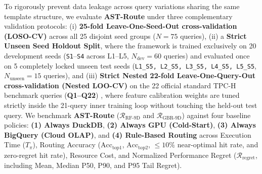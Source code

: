 \documentclass[10pt,a4paper]{article}
\begin{document}
To rigorously prevent data leakage across query variations sharing the same template structure, we evaluate \textbf{AST-Route} under three complementary validation protocols: (i) \textbf{25-fold Leave-One-Seed-Out cross-validation (LOSO-CV)} across all 25 disjoint seed groups ($N=75$ queries), (ii) a \textbf{Strict Unseen Seed Holdout Split}, where the framework is trained exclusively on 20 development seeds (\texttt{S1}--\texttt{S4} across L1--L5, $N_{\text{dev}}=60$ queries) and evaluated once on 5 completely locked unseen test seeds (\texttt{L1\_S5, L2\_S5, L3\_S5, L4\_S5, L5\_S5}, $N_{\text{unseen}}=15$ queries), and (iii) \textbf{Strict Nested 22-fold Leave-One-Query-Out cross-validation (Nested LOO-CV)} on the 22 official standard TPC-H benchmark queries (\textbf{Q1--Q22}) \cite{tpc2022tpch}, where feature calibration weights are tuned strictly inside the 21-query inner training loop without touching the held-out test query. We benchmark \textbf{AST-Route} ($\mathcal{R}_{\text{RF-9D}}$ and $\mathcal{R}_{\text{GBR-9D}}$) against four baseline policies: \textbf{(1) Always DuckDB}, \textbf{(2) Always GPU (Cold-Start)}, \textbf{(3) Always BigQuery (Cloud OLAP)}, and \textbf{(4) Rule-Based Routing} across Execution Time ($T_{\pi}$), Routing Accuracy ($\text{Acc}_{\text{top1}}$, $\text{Acc}_{\text{top2}}$, $\le 10\%$ near-optimal hit rate, and zero-regret hit rate), Resource Cost, and Normalized Performance Regret ($\mathcal{R}_{\text{regret}}$, including Mean, Median P50, P90, and P95 Tail Regret).
\end{document}
